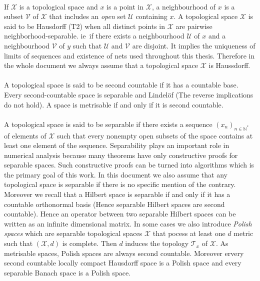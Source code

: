 \paragraph{}
If $\mathcal{X}$ is a topological space and $x$ is a point in $\mathcal{X}$, a
neighbourhood of $x$ is a subset $\mathcal{V}$ of $\mathcal{X}$ that includes
an \emph{open} set $\mathcal{U}$ containing $x$. A topological space
$\mathcal{X}$ is said to be Hausdorff (T2) when all distinct points in
$\mathcal{X}$ are pairwise neighborhood-separable. \acs{ie}~if there exists a
neighbourhood $\mathcal{U}$ of $x$ and a neighbourhood $\mathcal{V}$ of $y$
such that $\mathcal{U}$ and $\mathcal{V}$ are disjoint. It implies the
uniqueness of limits of sequences and existence of nets used throughout this
thesis. Therefore in the whole document we always assume that a topological
space $\mathcal{X}$ is Haussdorff.
\paragraph{}
A topological space is said to be second countable if it has a countable base.
Every second-countable space is separable and Lindel\"of (The reverse implications do not hold). A space is
metrisable if and only if it is second countable.
\paragraph{}
A topological space is said to be separable if there exists a sequence
$(x_n)_{n\in\mathbb{N}^*}$ of elements of $\mathcal{X}$ such that every
nonempty open subsets of the space contains at least one element of the
sequence. Separability plays an important role in numerical analysis because
many theorems have only constructive proofs for separable spaces. Such
constructive proofs can be turned into algorithms which is the primary goal of
this work. In this document we also assume that any topological space is
separable if there is no specific mention of the contrary. Moreover we recall
that a Hilbert space is separable if and only if it has a countable orthonormal
basis (Hence separable Hilbert spaces are second countable). Hence an operator
between two separable Hilbert spaces can be written as an infinite dimensional
matrix. In some cases we also introduce \emph{Polish spaces} which are
separable topological spaces $\mathcal{X}$ that pocess at least one $d$ metric
such that $(\mathcal{X}, d)$ is complete. Then $d$ induces the topology
$\mathcal{T}_x$ of $\mathcal{X}$. As metrisable spaces, Polish spaces are always
second countable. Moreover ervery second countable locally compact Hausdorff
space is a Polish space and every separable Banach space is a Polish space.
